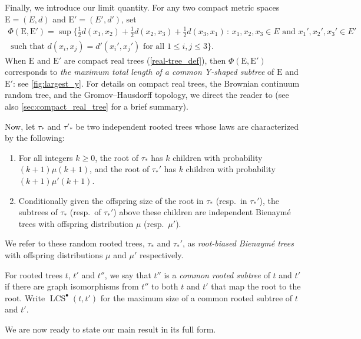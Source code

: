 \documentclass[11pt,reqno]{amsart}
\newcommand{\1}{\mathbf{1}}
\newcommand{\0}{\mathbf{0}}
\newcommand{\rE}{\mathrm{E}}
\newcommand{\LCS}{\operatorname{LCS}}
\begin{document}
Finally, we introduce our limit quantity. For any two compact metric spaces $\rE=(E,d)$ and $\rE'=(E',d')$, set
\begin{multline}
\label{Phi}
\Phi(\rE,\rE')=\sup\big\{\tfrac{1}{2}d(x_1,x_2)+\tfrac{1}{2}d(x_2,x_3)+\tfrac{1}{2}d(x_3,x_1) \, :\, x_1,x_2,x_3\in E\text{ and }x_1',x_2',x_3'\in E'\\
\text{ such that }d(x_i,x_j)=d'(x_i',x_j')\text{ for all }1\leq i,j\leq 3\big\}.
\end{multline}
When $\rE$ and $\rE'$ are compact real trees (\cref{real-tree_def}), then $\Phi(\rE,\rE')$ corresponds to \emph{the maximum total length of a common Y-shaped subtree} of $\rE$ and $\rE'$: see \cref{fig:largest_y}. For details on compact real trees, the Brownian continuum random tree, and the Gromov--Hausdorff topology, we direct the reader to \cite{legall2005random} (see also \cref{sec:compact_real_tree} for a brief summary).

Now, let $\tau_*$ and $\tau'_*$ be two independent rooted trees whose laws are characterized by the following:
\begin{enumerate}
    \item[(a)] For all integers $k\geq 0$, the root of $\tau_*$ has $k$ children with probability $(k+1)\mu(k+1)$, and the root of $\tau_*'$ has $k$ children with probability $(k+1)\mu'(k+1)$.
    \item[(b)] Conditionally given the offspring size of the root in $\tau_*$ (resp.~in $\tau_*'$), the subtrees of $\tau_*$ (resp.~of $\tau_*'$) above these children are independent Bienaymé trees with offspring distribution $\mu$ (resp.~$\mu'$).
\end{enumerate}
We refer to these random rooted trees, $\tau_*$ and $\tau_*'$, as \emph{root-biased Bienaym\'{e} trees} with offspring distributions $\mu$ and $\mu'$ respectively. 

For rooted trees $t$, $t'$ and $t''$, we say that $t''$ is a \emph{common rooted subtree} of $t$ and $t'$ if there are graph isomorphisms from $t''$ to both $t$ and $t'$ that map the root to the root. Write $\LCS^\bullet(t,t')$ for the maximum size of a common rooted subtree of $t$ and $t'$.
\smallskip

We are now ready to state our main result in its full form.
\end{document}
